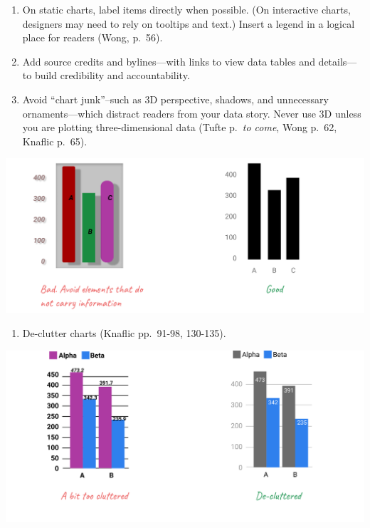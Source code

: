 \documentclass[
  english,
]{book}
\providecommand{\tightlist}{%
  \setlength{\itemsep}{0pt}\setlength{\parskip}{0pt}}
\begin{document}
\begin{enumerate}
\def\labelenumi{\arabic{enumi})}
\setcounter{enumi}{13}
\item
  On static charts, label items directly when possible. (On interactive charts, designers may need to rely on tooltips and text.) Insert a legend in a logical place for readers (Wong, p.~56).
\item
  Add source credits and bylines---with links to view data tables and details---to build credibility and accountability.
\item
  Avoid ``chart junk''--such as 3D perspective, shadows, and unnecessary ornaments---which distract readers from your data story. Never use 3D unless you are plotting three-dimensional data (Tufte p.~\emph{to come}, Wong p.~62, Knaflic p.~65).
\end{enumerate}

\includegraphics{images/05-chart/Chart - 16 - Avoid junk.png}

\begin{enumerate}
\def\labelenumi{\arabic{enumi})}
\setcounter{enumi}{16}
\tightlist
\item
  De-clutter charts (Knaflic pp.~91-98, 130-135).
\end{enumerate}

\includegraphics{images/05-chart/Chart - 17 - Declutter.png}
\end{document}
